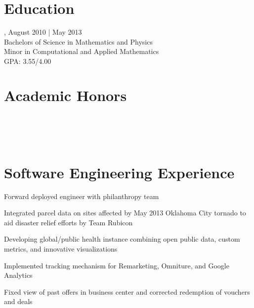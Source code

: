 \documentclass{onkursen-resume}
\begin{document}
\begin{multicols}{2}
\section*{Education}
, August 2010 | May 2013\\
Bachelors of Science in Mathematics and Physics\\
Minor in Computational and Applied Mathematics\\
GPA: 3.55/4.00

\section*{Academic Honors}
\noindent
{}\\
\\
\\
\end{multicols}

\hr

\section*{Software Engineering Experience}

\begin{itemize*}
\item Forward deployed engineer with philanthropy team
\item Integrated parcel data on sites affected by May 2013 Oklahoma City tornado to aid disaster relief efforts by Team Rubicon
\item Developing global/public health instance combining open public data, custom metrics, and innovative visualizations
\end{itemize*}

\begin{itemize*}
\item Implemented tracking mechanism for Remarketing, Omniture, and Google Analytics
\item Fixed view of past offers in business center and corrected redemption of vouchers and deals
\end{itemize*}
\end{document}
